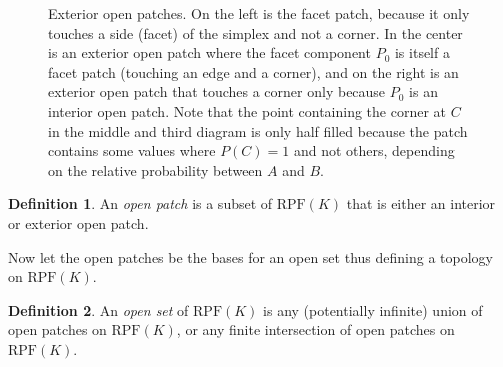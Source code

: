 \documentclass[twoside]{article}
\theoremstyle{plain}%
\theoremstyle{definition}
\newtheorem{definition}{Definition}[section]
\theoremstyle{remark}
\begin{document}
\begin{figure}[h]
{
}
\caption{Exterior open patches. On the left is the facet patch, because it only touches a side (facet) of the simplex and not a corner. In the center is an exterior open patch where the facet component \(P_0\) is itself a facet patch (touching an edge and a corner), and on the right is an exterior open patch that touches a corner only because \(P_0\) is an interior open patch. Note that the point containing the corner at \(C\) in the middle and third diagram is only half filled because the patch contains some values where \(P(C) = 1\) and not others, depending on the relative probability between \(A\) and \(B\).}
\label{fig:exterior_open_patch}
\end{figure}

\begin{definition}
An \textit{open patch} is a subset of \(\text{RPF}(K)\) that is either an interior or exterior open patch.
\end{definition}

Now let the open patches be the bases for an open set thus defining a topology on \(\text{RPF}(K)\).

\begin{definition}
An \textit{open set} of \(\text{RPF}(K)\) is any (potentially infinite) union of open patches on \(\text{RPF}(K)\), or any finite intersection of open patches on \(\text{RPF}(K)\).
\end{definition}
\end{document}
